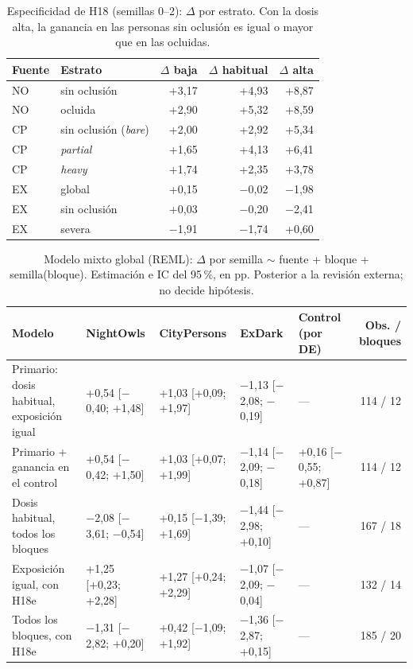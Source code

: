 \begin{table}[H]\centering\small
\caption{Especificidad de H18 (semillas 0--2): $\Delta$ por estrato. Con la dosis alta, la ganancia en las personas sin oclusión es igual o mayor que en las ocluidas.}
\begin{tabular}{@{}llrrr@{}}\toprule
Fuente & Estrato & $\Delta$ baja & $\Delta$ habitual & $\Delta$ alta \\\midrule
NO & sin oclusión & +3{,}17 & +4{,}93 & +8{,}87 \\
NO & ocluida & +2{,}90 & +5{,}32 & +8{,}59 \\
CP & sin oclusión (\emph{bare}) & +2{,}00 & +2{,}92 & +5{,}34 \\
CP & \emph{partial} & +1{,}65 & +4{,}13 & +6{,}41 \\
CP & \emph{heavy} & +1{,}74 & +2{,}35 & +3{,}78 \\
EX & global & +0{,}15 & $-$0{,}02 & $-$1{,}98 \\
EX & sin oclusión & +0{,}03 & $-$0{,}20 & $-$2{,}41 \\
EX & severa & $-$1{,}91 & $-$1{,}74 & +0{,}60 \\
\bottomrule\end{tabular}\end{table}

\begin{table}[H]\centering\small
\caption{Modelo mixto global (REML): $\Delta$ por semilla $\sim$ fuente + bloque + semilla(bloque). Estimación e IC del 95\,\%, en pp. Posterior a la revisión externa; no decide hipótesis.}
\begin{tabular}{@{}p{2.8cm}llllr@{}}\toprule
Modelo & NightOwls & CityPersons & ExDark & Control (por DE) & Obs. / bloques \\\midrule
Primario: dosis habitual, exposición igual & +0{,}54 [$-$0{,}40; +1{,}48] & +1{,}03 [+0{,}09; +1{,}97] & $-$1{,}13 [$-$2{,}08; $-$0{,}19] & --- & 114 / 12 \\
Primario + ganancia en el control & +0{,}54 [$-$0{,}42; +1{,}50] & +1{,}03 [+0{,}07; +1{,}99] & $-$1{,}14 [$-$2{,}09; $-$0{,}18] & +0{,}16 [$-$0{,}55; +0{,}87] & 114 / 12 \\
Dosis habitual, todos los bloques & $-$2{,}08 [$-$3{,}61; $-$0{,}54] & +0{,}15 [$-$1{,}39; +1{,}69] & $-$1{,}44 [$-$2{,}98; +0{,}10] & --- & 167 / 18 \\
Exposición igual, con H18e & +1{,}25 [+0{,}23; +2{,}28] & +1{,}27 [+0{,}24; +2{,}29] & $-$1{,}07 [$-$2{,}09; $-$0{,}04] & --- & 132 / 14 \\
Todos los bloques, con H18e & $-$1{,}31 [$-$2{,}82; +0{,}20] & +0{,}42 [$-$1{,}09; +1{,}92] & $-$1{,}36 [$-$2{,}87; +0{,}15] & --- & 185 / 20 \\
\bottomrule\end{tabular}\end{table}

